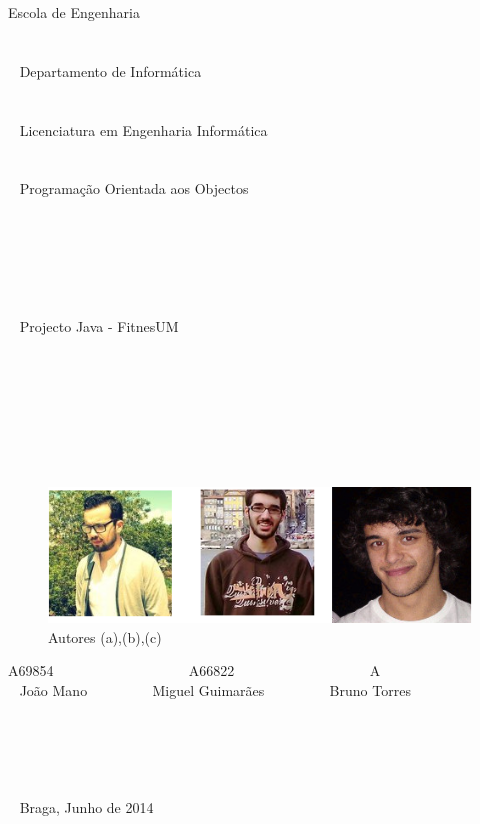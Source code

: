 \documentclass[10pt,notitlepage]{article}
\begin{document}
\begin{center}

Escola de Engenharia \\~ \\~ \\~  Departamento de Informática \\~ \\ ~ \\~ Licenciatura em Engenharia Informática \\~ \\~ \\~ Programação Orientada aos Objectos \\~ \\~ \\~ \\~ \\~ \\~ \\~  Projecto Java - FitnesUM \\~ \\~ \\~ \\~ \\~ \\~ \\~
\begin{figure}[h]
\centering
\includegraphics[scale=0.6]{autores.png}
\caption{Autores (a),(b),(c)}
\end{figure}

A69854 ~~~~~~~~~~~~~~~~~~ A66822 ~~~~~~~~~~~~~~~~~~ A   \\~  João Mano ~~~~~~~~ Miguel Guimarães ~~~~~~~~ Bruno Torres  \\~ \\~ \\~ \\~ \\~ \\~ Braga, Junho de 2014
\end{center}

\newpage


\tableofcontents

\newpage
\end{document}
